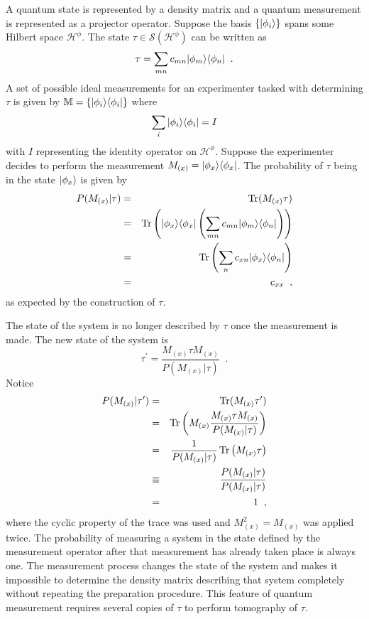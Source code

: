 A quantum state is represented by a density matrix and a quantum measurement is represented as a projector operator.  Suppose the basis $\{\left|\phi_i\right\rangle\}$ spans some Hilbert space $\mathcal{H}^\phi$.  The state $\tau\in\mathcal{S}(\mathcal{H}^\phi)$ can be written as 
$$
\tau = \sum_{mn} c_{mn} |\phi_m\rangle\langle\phi_n|\;\;.
$$
A set of possible ideal measurements for an experimenter tasked with determining $\tau$ is given by $\mathbb{M} = \{|\phi_i\rangle\langle\phi_i|\}$ where 
$$
\sum_i |\phi_i\rangle\langle\phi_i| = I
$$
with $I$ representing the identity operator on $\mathcal{H}^\phi$.  Suppose the experimenter decides to perform the measurement $M_{(x)} = |\phi_x\rangle\langle\phi_x|$.  The probability of $\tau$ being in the state $\left|\phi_x\right\rangle$ is given by
\begin{eqnarray}
P(M_{(x)}|\tau) &=& \operatorname{Tr}(M_{(x)}\tau)\nonumber\\
&=& \operatorname{Tr}\left( |\phi_x\rangle\langle\phi_x| \left( \sum_{mn} c_{mn} |\phi_m\rangle\langle\phi_n| \right) \right)\nonumber\\
&=& \operatorname{Tr}\left( \sum_n c_{xn} |\phi_x\rangle\langle\phi_n| \right)\nonumber\\
&=& c_{xx} \label{eqn:diagterms}\;\;,
\end{eqnarray}
as expected by the construction of $\tau$.  

The state of the system is no longer described by $\tau$ once the measurement is made.  The new state of the system is
$$
\tau^\prime = \frac{M_{(x)}\tau M_{(x)}}{P(M_{(x)}|\tau)}\;\;.
$$
Notice
\begin{eqnarray*}
P(M_{(x)}|{\tau^\prime}) &=& \operatorname{Tr}(M_{(x)}\tau^\prime)\\
&=& \operatorname{Tr}\left( M_{(x)} \frac{M_{(x)}\tau M_{(x)}}{P(M_{(x)}|\tau)} \right)\\
&=& \frac{1}{P(M_{(x)}|\tau)} \operatorname{Tr}\left( M_{(x)}\tau\right)\\
&\equiv& \frac{P(M_{(x)}|\tau)}{P(M_{(x)}|\tau)}\\
&=& 1\;\;,
\end{eqnarray*}
where the cyclic property of the trace was used and $M_{(x)}^2=M_{(x)}$ was applied twice.  The probability of measuring a system in the state defined by the measurement operator after that measurement has already taken place is always one.  The measurement process changes the state of the system and makes it impossible to determine the density matrix describing that system completely without repeating the preparation procedure.  This feature of quantum measurement requires several copies of $\tau$ to perform tomography of $\tau$.  

